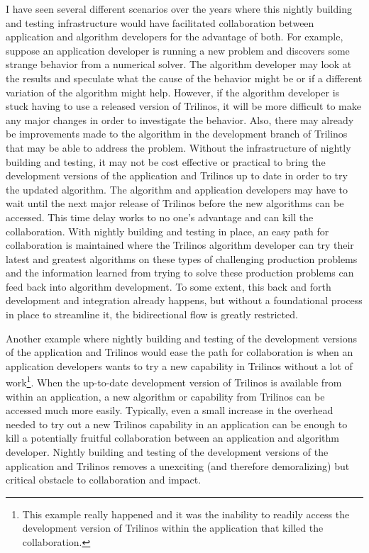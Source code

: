\documentclass[pdf,ps2pdf,11pt]{SANDreport}
\begin{document}
I have seen several different scenarios over the years where this nightly
building and testing infrastructure would have facilitated collaboration
between application and algorithm developers for the advantage of both.  For
example, suppose an application developer is running a new problem and
discovers some strange behavior from a numerical solver.  The algorithm
developer may look at the results and speculate what the cause of the behavior
might be or if a different variation of the algorithm might help.  However, if
the algorithm developer is stuck having to use a released version of Trilinos,
it will be more difficult to make any major changes in order to investigate
the behavior.  Also, there may already be improvements made to the algorithm
in the development branch of Trilinos that may be able to address the problem.
Without the infrastructure of nightly building and testing, it may not be cost
effective or practical to bring the development versions of the application
and Trilinos up to date in order to try the updated algorithm.  The algorithm
and application developers may have to wait until the next major release of
Trilinos before the new algorithms can be accessed.  This time delay works to
no one's advantage and can kill the collaboration.  With nightly building and
testing in place, an easy path for collaboration is maintained where the
Trilinos algorithm developer can try their latest and greatest algorithms on
these types of challenging production problems and the information learned
from trying to solve these production problems can feed back into algorithm
development.  To some extent, this back and forth development and integration
already happens, but without a foundational process in place to streamline it,
the bidirectional flow is greatly restricted.

Another example where nightly building and testing of the development versions
of the application and Trilinos would ease the path for collaboration is when
an application developers wants to try a new capability in Trilinos without a
lot of work\footnote{This example really happened and it was the inability to
readily access the development version of Trilinos within the application that
killed the collaboration.}.  When the up-to-date development version of
Trilinos is available from within an application, a new algorithm or
capability from Trilinos can be accessed much more easily.  Typically, even a
small increase in the overhead needed to try out a new Trilinos capability in
an application can be enough to kill a potentially fruitful collaboration
between an application and algorithm developer.  Nightly building and testing
of the development versions of the application and Trilinos removes a
unexciting (and therefore demoralizing) but critical obstacle to collaboration
and impact.
\end{document}
